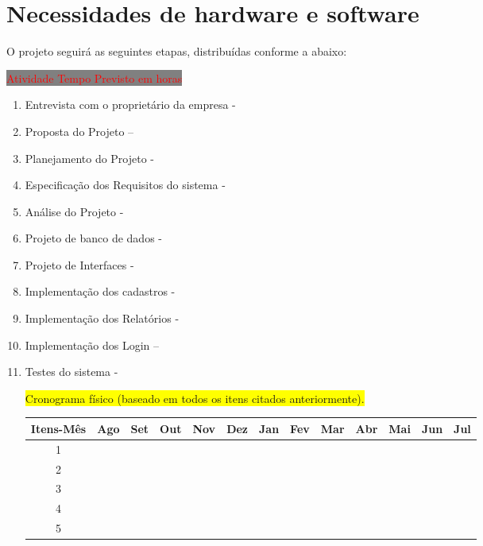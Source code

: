 \section{Necessidades de hardware e software}

\noindent {}

\vspace{0.5cm}

O projeto seguirá as seguintes etapas,  distribuídas conforme a abaixo:

\colorbox{gray}{\textcolor{red}{ Atividade \hspace{9cm}Tempo Previsto em horas} }

\begin{enumerate}
    \item Entrevista com o proprietário da empresa -   
    \item Proposta do Projeto – 
    \item Planejamento do Projeto -
    \item Especificação dos Requisitos do sistema - 
    \item Análise do Projeto - 
    \item Projeto de banco de dados - 
    \item Projeto de Interfaces - 
    \item Implementação dos cadastros - 
    \item Implementação dos Relatórios - 
    \item Implementação dos Login – 
    \item Testes do sistema -  
    
    \colorbox{yellow}{Cronograma físico (baseado em todos os itens citados anteriormente).}
    
    \begin{center}
    \begin{tabular}{|c|c|c|c|c|c|c|c|c|c|c|c|c|} \hline
    Itens-Mês & Ago & Set & Out & Nov & Dez & Jan & Fev & Mar & Abr & Mai & Jun & Jul \\ \hline
    1 & \cellcolor{gray} & \cellcolor{gray} &  &  &  &  &  &  &  &  &  &  \\ \hline
    2 &  & \cellcolor{gray}  & \cellcolor{gray} &  &  &  &  &  &  &  &  &  \\ \hline
    3 &  &  & \cellcolor{gray} & \cellcolor{gray} &  &  &  &  &  &  &  &  \\ \hline
    4 &  &  &  &  &  &  &  &  &  &  &  &  \\ \hline
    5 &  &  &  &  &  &  &  &  &  &  &  &  \\ \hline
     
    \end{tabular}
\end{center}

\end{enumerate}

\vspace{0.5cm}